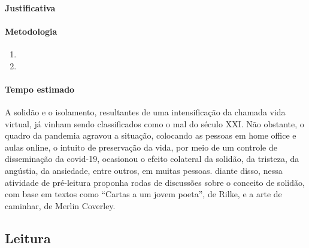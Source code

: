 \documentclass[12pt]{extarticle}
\begin{document}
\paragraph{Justificativa}

\paragraph{Metodologia}
\begin{enumerate}
	\item
	\item
\end{enumerate}

\paragraph{Tempo estimado}

A solidão e o isolamento, resultantes de uma intensificação
da chamada vida virtual, já vinham sendo classificados como o mal do
século XXI. Não obstante, o quadro da pandemia agravou a situação,
colocando as pessoas em home office e aulas online, o intuito de
preservação da vida, por meio de um controle de disseminação da
covid-19, ocasionou o efeito colateral da solidão, da tristeza, da
angústia, da ansiedade, entre outros, em muitas pessoas. diante disso,
nessa atividade de pré-leitura proponha rodas de discussões sobre o
conceito de solidão, com base em textos como ``Cartas a um jovem poeta'', de
Rilke, e a arte de caminhar, de Merlin Coverley.

\subsection{Leitura}

\end{document}
